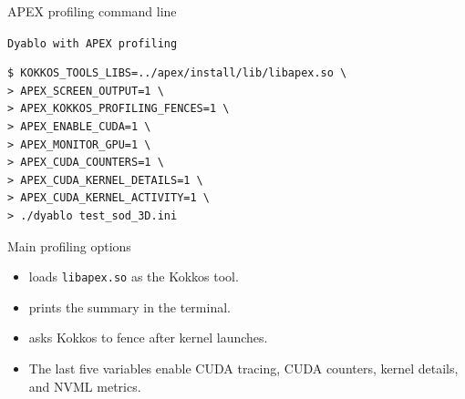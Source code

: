 \documentclass[11pt]{beamer}
\begin{document}
\begin{frame}[fragile,t]{APEX profiling command line}
\begin{beamerboxesrounded}[upper=terminal title,lower=terminal body,width=\linewidth,shadow=false]{%
\textcolor{red!70}{\footnotesize\textbullet}\hspace{0.15em}%
\textcolor{yellow!80}{\footnotesize\textbullet}\hspace{0.15em}%
\textcolor{green!70!black}{\footnotesize\textbullet}\hspace{0.55em}%
\texttt{\scriptsize Dyablo with APEX profiling}}
\begin{lstlisting}[style=terminal,basicstyle=\ttfamily\scriptsize\color{termText}]
$ KOKKOS_TOOLS_LIBS=../apex/install/lib/libapex.so \
> APEX_SCREEN_OUTPUT=1 \
> APEX_KOKKOS_PROFILING_FENCES=1 \
> APEX_ENABLE_CUDA=1 \
> APEX_MONITOR_GPU=1 \
> APEX_CUDA_COUNTERS=1 \
> APEX_CUDA_KERNEL_DETAILS=1 \
> APEX_CUDA_KERNEL_ACTIVITY=1 \
> ./dyablo test_sod_3D.ini
\end{lstlisting}
\end{beamerboxesrounded}

{\color{ceaGreen}\footnotesize Main profiling options}
\footnotesize
\begin{itemize}\itemsep0.06em
    \item {} loads \texttt{libapex.so} as the Kokkos tool.
    \item {} prints the summary in the terminal.
    \item {} asks Kokkos to fence after kernel launches.
    \item The last five variables enable CUDA tracing, CUDA counters, kernel details, and NVML metrics.
\end{itemize}
\end{frame}
\end{document}
